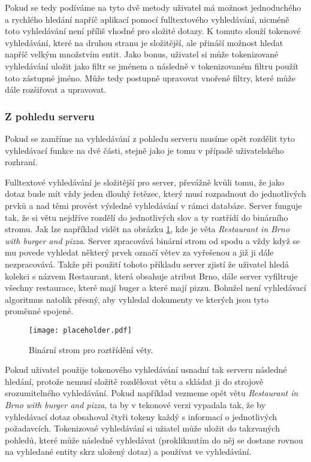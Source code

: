 \par Pokud se tedy podíváme na tyto dvě metody uživatel má možnost jednoduchého a rychlého hledání napříč aplikací pomocí fulltextového vyhledávání, nicméně toto vyhledávání není příliš vhodné pro složité dotazy. K tomuto slouží tokenové vyhledávání, které na druhou stranu je složitější, ale přináší možnost hledat napříč velkým množstvím entit. Jako bonus, uživatel si může tokenizované vyhledávání uložit jako filtr se jménem a následně v tokenizovaném filtru použít toto zástupné jméno. Může tedy postupně upravovat vnořené filtry, které může dále rozšiřovat a upravovat.

\subsubsection{Z pohledu serveru}
\par Pokud se zamříme na vyhledávání z pohledu serveru musíme opět rozdělit tyto vyhledávací funkce na dvě části, stejně jako je tomu v případě uživatelského rozhraní.

\par Fulltextové vyhledávání je složitější pro server, převážně kvůli tomu, že jako dotaz bude mít vždy jeden dlouhý řetězec, který musí rozpadnout do jednotlivých prvků a nad těmi provést výsledné vyhledávání v rámci databáze. Server funguje tak, že si větu nejdříve rozdělí do jednotlivých slov a ty roztřídí do binárního stromu. Jak lze například vidět na obrázku \ref{binarni-strom}, kde je věta \textit{Restaurant in Brno with burger and pizza}. Server zpracovává binární strom od spodu a vždy když se mu povede vyhledat některý prvek označí větev za vyřešenou a již ji dále nezpracovává. Takže při použití tohoto příkladu server zjistí že uživatel hledá kolekci s názvem Restaurant, která obsahuje atribut Brno, dále server vyfiltruje všechny restaurace, které mají buger a které mají pizzu. Bohužel není vyhledávací algoritmus natolik přesný, aby vyhledal dokumenty ve kterých jsou tyto proměnné spojené.

\begin{figure}[htp]
  \centering
  \texttt{[image: placeholder.pdf]}
  \caption{Binární strom pro roztřídění věty.}
  \label{binarni-strom}
\end{figure}

\par Pokud uživatel použije tokenového vyhledávání usnadní tak serveru následné hledání, protože nemusí složitě rozdělovat větu a skládat ji do strojově srozumitelného vyhledávání. Pokud například vezmeme opět větu \textit{Restaurant in Brno with burger and pizza}, ta by v tekonové verzi vypadala tak, že by vyhledávací dotaz obsahoval čtyři tokeny každý s informací o jednotlivých požadavcích. Tokenizovaé vyhledávání si užiatel může uložit do takzvaných pohledů, které může následně vyhledávat (prokliknutím do něj se dostane rovnou na vyhledané entity skrz uložený dotaz) a používat ve vyhledávání.

